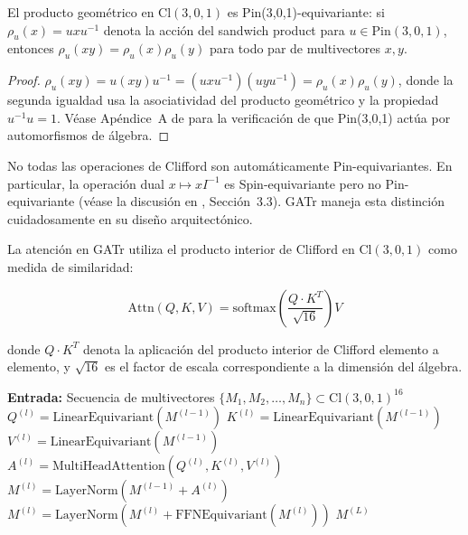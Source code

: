 \begin{theorem}\label{thm:equivarianza_automatica_gatr}
El producto geométrico en $\text{Cl}(3,0,1)$ es Pin(3,0,1)-equivariante: si $\rho_u(x) = uxu^{-1}$ denota la acción del sandwich product para $u \in \text{Pin}(3,0,1)$, entonces $\rho_u(xy) = \rho_u(x)\rho_u(y)$ para todo par de multivectores $x, y$.
\end{theorem}

\begin{proof}
$\rho_u(xy) = u(xy)u^{-1} = (uxu^{-1})(uyu^{-1}) = \rho_u(x)\rho_u(y)$, donde la segunda igualdad usa la asociatividad del producto geométrico y la propiedad $u^{-1}u = 1$. Véase Apéndice~A de \citet{brehmer2023geometric} para la verificación de que Pin(3,0,1) actúa por automorfismos de álgebra.
\end{proof}

\begin{remark}
No todas las operaciones de Clifford son automáticamente Pin-equivariantes. En particular, la operación dual $x \mapsto xI^{-1}$ es Spin-equivariante pero no Pin-equivariante (véase la discusión en \citet{brehmer2023geometric}, Sección~3.3). GATr maneja esta distinción cuidadosamente en su diseño arquitectónico.
\end{remark}

\begin{definition}\label{def:atencion_geometrica_gatr}
La atención en GATr utiliza el producto interior de Clifford en $\text{Cl}(3,0,1)$ como medida de similaridad:

\begin{equation}
    \text{Attn}(Q, K, V) = \text{softmax}\left(\frac{Q \cdot K^T}{\sqrt{16}}\right) V
\end{equation}

donde $Q \cdot K^T$ denota la aplicación del producto interior de Clifford elemento a elemento, y $\sqrt{16}$ es el factor de escala correspondiente a la dimensión del álgebra.
\end{definition}

\begin{algorithm}[H]
\caption{Forward Pass de GATr}
\label{alg:forward_gatr}
\begin{algorithmic}[1]
    \State \textbf{Entrada:} Secuencia de multivectores $\{M_1, M_2, \ldots, M_n\} \subset \text{Cl}(3,0,1)^{16}$
        \State $Q^{(l)} = \text{LinearEquivariant}(M^{(l-1)})$
        \State $K^{(l)} = \text{LinearEquivariant}(M^{(l-1)})$
        \State $V^{(l)} = \text{LinearEquivariant}(M^{(l-1)})$
        \State $A^{(l)} = \text{MultiHeadAttention}(Q^{(l)}, K^{(l)}, V^{(l)})$
        \State $M^{(l)} = \text{LayerNorm}(M^{(l-1)} + A^{(l)})$
        \State $M^{(l)} = \text{LayerNorm}(M^{(l)} + \text{FFNEquivariant}(M^{(l)}))$
    \EndFor
    \State \Return $M^{(L)}$
\end{algorithmic}
\end{algorithm}

